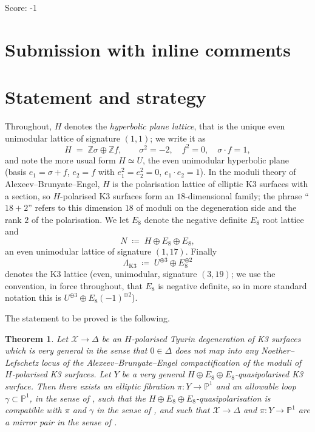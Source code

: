\documentclass[11pt]{article}
\newtheorem{theorem}{Theorem}[section]
\newcommand{\X}{\mathcal{X}}
\newcommand{\D}{\Delta}
\newcommand{\PP}{\mathbb{P}}
\newcommand{\bZ}{\mathbb{Z}}
\begin{document}
\noindent Score: -1

\newpage
\section{Submission with inline comments}


\section{Statement and strategy}


Throughout, $H$ denotes the \emph{hyperbolic plane lattice}, that is the
unique even unimodular lattice of signature $(1,1)$; we write it as
\[
H \;=\; \bZ\sigma \oplus \bZ f,\qquad
\sigma^2 = -2,\quad f^2=0,\quad \sigma\cdot f = 1,
\]
and note the more usual form $H\simeq U$, the even unimodular hyperbolic
plane (basis $e_1 = \sigma+f$, $e_2 = f$ with $e_1^2=e_2^2=0$,
$e_1\cdot e_2 = 1$). In the moduli theory of Alexeev--Brunyate--Engel, $H$
is the polarisation lattice of elliptic K3 surfaces with a section, so
$H$-polarised K3 surfaces form an $18$-dimensional family; the phrase
``$18+2$'' refers to this dimension $18$ of moduli on the degeneration side
and the rank $2$ of the polarisation. We let $E_8$ denote the negative
definite $E_8$ root lattice and
\[
N \;\coloneqq\; H \oplus E_8 \oplus E_8,
\]
an even unimodular lattice of signature $(1,17)$. Finally
\[
\Lambda_{\mathrm{K3}} \;\coloneqq\; U^{\oplus 3}\oplus E_8^{\oplus 2}
\]
denotes the K3 lattice (even, unimodular, signature $(3,19)$; we use the
convention, in force throughout, that $E_8$ is negative definite, so in
more standard notation this is
$U^{\oplus3}\oplus E_8(-1)^{\oplus2}$).

The statement to be proved is the following.

\begin{theorem}\label{thm:main}
Let $\X\to\D$ be an $H$-polarised Tyurin degeneration of K3 surfaces which is
very general in the sense that $0\in\D$ does not map into any
Noether--Lefschetz locus of the Alexeev--Brunyate--Engel compactification of
the moduli of $H$-polarised K3 surfaces. Let $Y$ be a very general $H\oplus
E_8\oplus E_8$-quasipolarised K3 surface. Then there exists an elliptic
fibration $\pi\colon Y\to\PP^1$ and an allowable loop
$\gamma\subset\PP^1$, in the sense of {\upshape[GT, Definition 4.11]}, such
that the $H\oplus E_8\oplus E_8$-quasipolarisation is compatible with $\pi$
and $\gamma$ in the sense of {\upshape[GT, Definition 4.21]}, and such that
$\X\to\D$ and $\pi\colon Y\to\PP^1$ are a mirror pair in the sense of
{\upshape[GT, Definition 5.1]}.
\end{theorem}
\end{document}
